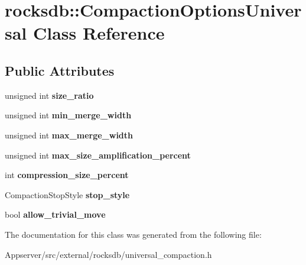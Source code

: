 \hypertarget{classrocksdb_1_1CompactionOptionsUniversal}{}\section{rocksdb\+:\+:Compaction\+Options\+Universal Class Reference}
\label{classrocksdb_1_1CompactionOptionsUniversal}
\subsection*{Public Attributes}
\begin{DoxyCompactItemize}
\item 
unsigned int {\bfseries size\+\_\+ratio}\hypertarget{classrocksdb_1_1CompactionOptionsUniversal_afe1e4100c1ce559c539b020ec7b46361}{}\label{classrocksdb_1_1CompactionOptionsUniversal_afe1e4100c1ce559c539b020ec7b46361}

\item 
unsigned int {\bfseries min\+\_\+merge\+\_\+width}\hypertarget{classrocksdb_1_1CompactionOptionsUniversal_a2e0a22409db14dedca88773e9c47e778}{}\label{classrocksdb_1_1CompactionOptionsUniversal_a2e0a22409db14dedca88773e9c47e778}

\item 
unsigned int {\bfseries max\+\_\+merge\+\_\+width}\hypertarget{classrocksdb_1_1CompactionOptionsUniversal_af30ea01da6c70b626b955f6df59f33a1}{}\label{classrocksdb_1_1CompactionOptionsUniversal_af30ea01da6c70b626b955f6df59f33a1}

\item 
unsigned int {\bfseries max\+\_\+size\+\_\+amplification\+\_\+percent}\hypertarget{classrocksdb_1_1CompactionOptionsUniversal_a4ac3f2dc4ee2552b49607c5b70b706ce}{}\label{classrocksdb_1_1CompactionOptionsUniversal_a4ac3f2dc4ee2552b49607c5b70b706ce}

\item 
int {\bfseries compression\+\_\+size\+\_\+percent}\hypertarget{classrocksdb_1_1CompactionOptionsUniversal_afcd15128bac78da1023eff339c63d015}{}\label{classrocksdb_1_1CompactionOptionsUniversal_afcd15128bac78da1023eff339c63d015}

\item 
Compaction\+Stop\+Style {\bfseries stop\+\_\+style}\hypertarget{classrocksdb_1_1CompactionOptionsUniversal_a53e5e3acf69baac66b091cce16b2a75c}{}\label{classrocksdb_1_1CompactionOptionsUniversal_a53e5e3acf69baac66b091cce16b2a75c}

\item 
bool {\bfseries allow\+\_\+trivial\+\_\+move}\hypertarget{classrocksdb_1_1CompactionOptionsUniversal_a24e1ae7e7a15717c6abf720cc0a2a1dc}{}\label{classrocksdb_1_1CompactionOptionsUniversal_a24e1ae7e7a15717c6abf720cc0a2a1dc}

\end{DoxyCompactItemize}


The documentation for this class was generated from the following file\+:\begin{DoxyCompactItemize}
\item 
Appserver/src/external/rocksdb/universal\+\_\+compaction.\+h\end{DoxyCompactItemize}
